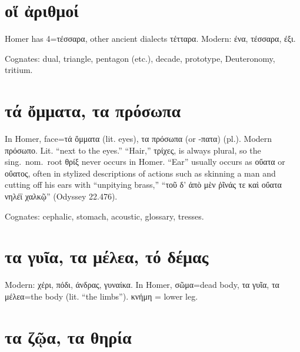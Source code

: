 \documentclass[12pt,openany]{book}
\newenvironment{notes}{\vfill\scriptsize\begin{flushright}}{\end{flushright}}
\newcommand{\fig}[1]{\begin{center}\end{center}}
\begin{document}

\chapter{οἵ ἀριθμοί}

\fig{numbers/numbers.svg}

\begin{notes}
Homer has 4=τέσσαρα, other ancient dialects τέτταρα.
Modern: ένα, τέσσαρα, έξι.

Cognates: dual, triangle, pentagon (etc.), decade,
prototype, Deuteronomy, tritium.
\end{notes}


\chapter{τά ὄμματα, τα πρόσωπα}

\fig{face/face.svg}

\begin{notes}
In Homer, face=τά ὄμματα (lit. eyes), τα πρόσωπα (or -πατα) (pl.).
Modern πρόσωπο. Lit. ``next to the eyes.''
``Hair,'' τρίχες, is always plural, so the sing.~nom.~root θρίξ never occurs in Homer.
``Ear'' usually occurs as οὔατα or οὔατος, often in stylized descriptions of actions such as
skinning a man and cutting off his ears with ``unpitying brass,'' ``τοῦ δ' ἀπὸ μὲν ῥῖνάς τε καὶ οὔατα νηλέϊ χαλκῷ'' (Odyssey 22.476).


Cognates: cephalic, stomach,
acoustic, glossary, tresses.
\end{notes}


\chapter{τα γυῖα, τα μέλεα, τό δέμας}

\fig{body/body.svg}

\begin{notes}
Modern: χέρι, πόδι, άνδρας, γυναίκα. In Homer, σῶμα=dead body, τα γυῖα, τα μέλεα=the body (lit. ``the limbs'').
κνήμη = lower leg.
\end{notes}


\chapter{τα ζῷα, τα θηρία}
\end{document}
